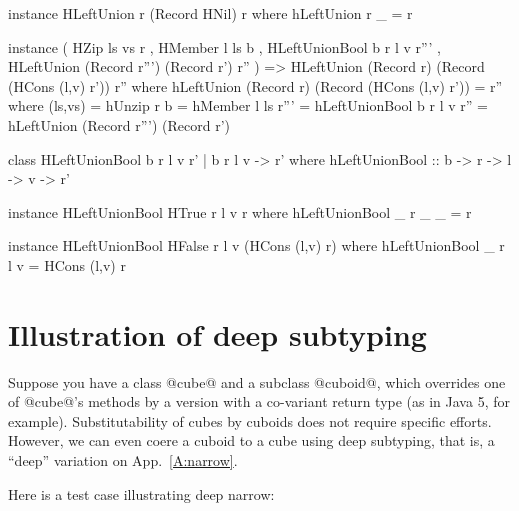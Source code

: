 \begin{code}
 instance HLeftUnion r (Record HNil) r
  where   hLeftUnion r _ = r
\end{code}

\begin{code}
 instance ( HZip ls vs r
          , HMember l ls b
          , HLeftUnionBool b r l v r'''
          , HLeftUnion (Record r''') (Record r') r''
          )
            => HLeftUnion (Record r) (Record (HCons (l,v) r')) r''
  where
   hLeftUnion (Record r) (Record (HCons (l,v) r')) = r''
    where
     (ls,vs) = hUnzip r
     b       = hMember l ls
     r'''    = hLeftUnionBool b r l v
     r''     = hLeftUnion (Record r''') (Record r')
\end{code}

\begin{code}
 class  HLeftUnionBool b r l v r' | b r l v -> r'
  where hLeftUnionBool :: b -> r -> l -> v -> r'
\end{code}

\begin{code}
 instance HLeftUnionBool HTrue r l v r
    where hLeftUnionBool _ r _ _ = r
\end{code}

\begin{code}
 instance HLeftUnionBool HFalse r l v (HCons (l,v) r)
    where hLeftUnionBool _ r l v = HCons (l,v) r
\end{code}






\section{Illustration of deep subtyping}
\label{A:deep}

Suppose you have a class @cube@ and a subclass @cuboid@, which
overrides one of @cube@'s methods by a version with a co-variant
return type (as in Java 5, for example). Substitutability of cubes by
cuboids does not require specific efforts. However, we can even coere
a cuboid to a cube using deep subtyping, that is, a ``deep'' variation
on App.~\ref{A:narrow}.

\medskip

\noindent
Here is a test case illustrating deep narrow:

